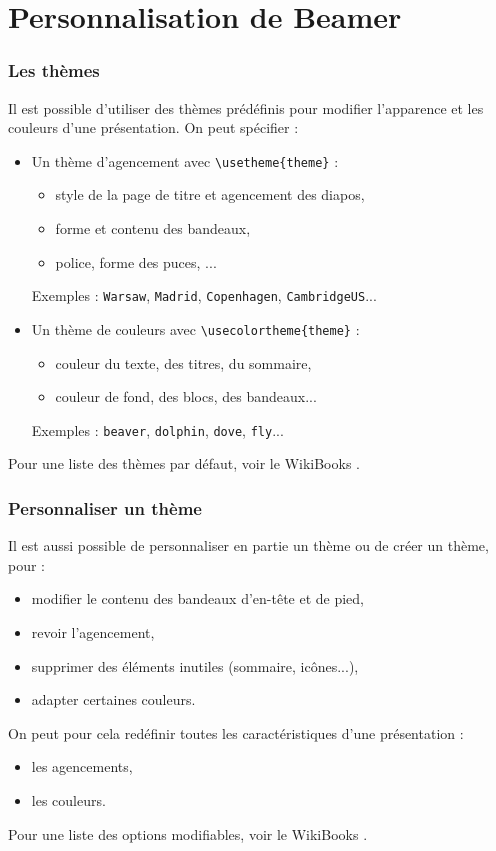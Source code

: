\section{Personnalisation de Beamer}

\begin{frame}[fragile]
  \frametitle{Les thèmes}

Il est possible d'utiliser des thèmes prédéfinis pour modifier l'apparence et les couleurs d'une présentation. On peut spécifier :
\begin{itemize}
  \item Un thème d'agencement avec \lstinline?\usetheme{theme}? :
  \begin{itemize}
    \item style de la page de titre et agencement des diapos,
    \item forme et contenu des bandeaux,
    \item police, forme des puces, ...
  \end{itemize}
  Exemples : \lstinline?Warsaw?, \lstinline?Madrid?, \lstinline?Copenhagen?, \lstinline?CambridgeUS?...
  \item Un thème de couleurs avec \lstinline?\usecolortheme{theme}? :
  \begin{itemize}
    \item couleur du texte, des titres, du sommaire,
    \item couleur de fond, des blocs, des bandeaux...
  \end{itemize}
  Exemples : \lstinline?beaver?, \lstinline?dolphin?, \lstinline?dove?, \lstinline?fly?...
\end{itemize}

\bigskip
Pour une liste des thèmes par défaut, voir le WikiBooks \cite{wikibooksbeamer}.
\end{frame}



\begin{frame}[fragile]
  \frametitle{Personnaliser un thème}

Il est aussi possible de personnaliser en partie un thème ou de créer un thème, pour :
\begin{itemize}
  \item modifier le contenu des bandeaux d'en-tête et de pied,
  \item revoir l'agencement,
  \item supprimer des éléments inutiles (sommaire, icônes...),
  \item adapter certaines couleurs.
\end{itemize}

\bigskip
On peut pour cela redéfinir toutes les caractéristiques d'une présentation :
\begin{itemize}
  \item les agencements,
  \item les couleurs.
\end{itemize}

\bigskip
Pour une liste des options modifiables, voir le WikiBooks \cite{wikibooksbeamer}.
\end{frame}



